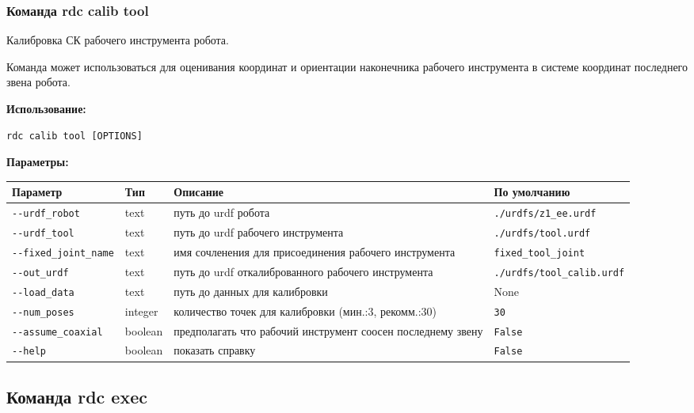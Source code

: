 \hypertarget{rdc-calib-tool}{%
\subsubsection{ Команда rdc calib tool}\label{rdc-calib-tool}}

Калибровка СК рабочего инструмента робота.

Команда может использоваться для оценивания координат и ориентации наконечника рабочего инструмента в системе координат последнего звена робота.

\textbf{Использование:}
\begin{lstlisting}[language=python, numbers=none, frame=single]
rdc calib tool [OPTIONS]
\end{lstlisting}

\textbf{Параметры:}
\begin{center}
\fontsize{10pt}{10pt}\selectfont
\begin{longtable}[]{p{4.5cm}|p{2cm}|p{4.0cm}|p{5.2cm}}
    \hline
\toprule()
Параметр & Тип & Описание & По умолчанию \\
\hline
\midrule()
\endhead
\texttt{-\/-urdf\_robot} & text & путь до urdf робота &
\texttt{./urdfs/z1\_ee.urdf} \\
\hline
\texttt{-\/-urdf\_tool} & text & путь до urdf рабочего инструмента &
\texttt{./urdfs/tool.urdf} \\
\hline
\texttt{-\/-fixed\_joint\_name} & text & имя сочленения для присоединения рабочего инструмента &
\texttt{fixed\_tool\_joint} \\
\hline
\texttt{-\/-out\_urdf} & text & путь до urdf откалиброванного рабочего инструмента &
\texttt{./urdfs/tool\_calib.urdf} \\
\hline
\texttt{-\/-load\_data} & text & путь до данных для калибровки & None \\
\hline
\texttt{-\/-num\_poses} & integer & количество  точек для калибровки
(мин.:3, рекомм.:30) & \texttt{30} \\
\hline
\texttt{-\/-assume\_coaxial} & boolean & предполагать что рабочий инструмент соосен последнему звену & \texttt{False} \\
\hline
\texttt{-\/-help} & boolean & показать справку &
\texttt{False} \\
\bottomrule()
\hline
\end{longtable}
\end{center}

\hypertarget{rdc-exec}{%
\subsection{Команда rdc exec}\label{rdc-exec}}

